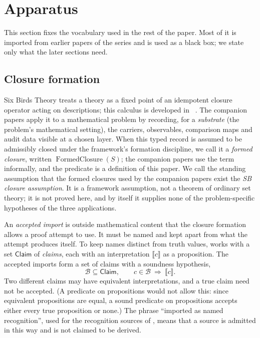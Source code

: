 \section{Apparatus}\label{sec:apparatus}

This section fixes the vocabulary used in the rest of the paper.  Most
of it is imported from earlier papers of the series and is used as a
black box; we state only what the later sections need.

\subsection{Closure formation}\label{sec:apparatus:closure-formation}

Six Birds Theory treats a theory as a fixed point of an idempotent
closure operator acting on descriptions; this calculus is developed in
\FOne\ \cite{Tsiokos2026EmergenceCalculus}.  The companion papers apply
it to a mathematical problem by recording, for a \emph{substrate} (the
problem's mathematical setting), the carriers, observables, comparison
maps and audit data visible at a chosen layer.  When this typed record
is assumed to be admissibly closed under the framework's formation
discipline, we call it a \emph{formed closure}, written
\(\operatorname{FormedClosure}(S)\); the companion papers use the term
informally, and the predicate is a definition of this paper.
We call the standing assumption that the formed closures used by the
companion papers exist the \emph{SB closure assumption}.  It is a
framework assumption, not a theorem of ordinary set theory; it is not
proved here, and by itself it supplies none of the problem-specific
hypotheses of the three applications.

An \emph{accepted import} is outside mathematical content that the
closure formation allows a proof attempt to use.  It must be named and
kept apart from what the attempt produces itself.  To keep names
distinct from truth values,  works with a set
\(\mathsf{Claim}\) of \emph{claims}, each with an interpretation
\(\llbracket c\rrbracket\) as a proposition.  The accepted imports form
a set of claims with a soundness hypothesis,
\[
  \mathcal B\subseteq\mathsf{Claim},\qquad
  c\in\mathcal B\ \Rightarrow\ \llbracket c\rrbracket .
\]
Two different claims may have equivalent interpretations, and a true
claim need not be accepted.  (A predicate on propositions would not
allow this: since equivalent propositions are equal, a sound predicate
on propositions accepts either every true proposition or none.)  The phrase
``imported as named recognition'', used for the recognition sources of
, means that a source is admitted in this way and
is not claimed to be derived.

